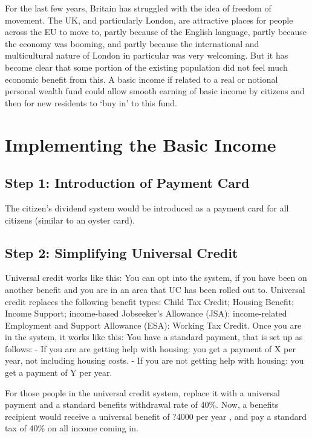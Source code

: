 \documentclass[]{tufte-handout}
\begin{document}
For the last few years, Britain has struggled with the idea of freedom
of movement. The UK, and particularly London, are attractive places for
people across the EU to move to, partly because of the English language,
partly because the economy was booming, and partly because the
international and multicultural nature of London in particular was very
welcoming. But it has become clear that some portion of the existing
population did not feel much economic benefit from this. A basic income
if related to a real or notional personal wealth fund could allow smooth
earning of basic income by citizens and then for new residents to `buy
in' to this fund.

\hypertarget{implementing-the-basic-income}{%
\section{Implementing the Basic
Income}\label{implementing-the-basic-income}}

\hypertarget{step-1-introduction-of-payment-card}{%
\subsection{Step 1: Introduction of Payment
Card}\label{step-1-introduction-of-payment-card}}

The citizen's dividend system would be introduced as a payment card for
all citizens (similar to an oyster card).

\hypertarget{step-2-simplifying-universal-credit}{%
\subsection{Step 2: Simplifying Universal
Credit}\label{step-2-simplifying-universal-credit}}

Universal credit works like this: You can opt into the system, if you
have been on another benefit and you are in an area that UC has been
rolled out to. Universal credit replaces the following benefit types:
Child Tax Credit; Housing Benefit; Income Support; income-based
Jobseeker's Allowance (JSA): income-related Employment and Support
Allowance (ESA): Working Tax Credit. Once you are in the system, it
works like this: You have a standard payment, that is set up as follows:
- If you are are getting help with housing: you get a payment of X per
year, not including housing costs. - If you are not getting help with
housing: you get a payment of Y per year.

For those people in the universal credit system, replace it with a
universal payment and a standard benefits withdrawal rate of 40\%. Now,
a benefits recipient would receive a universal benefit of ?4000 per year
, and pay a standard tax of 40\% on all income coming in.
\end{document}
